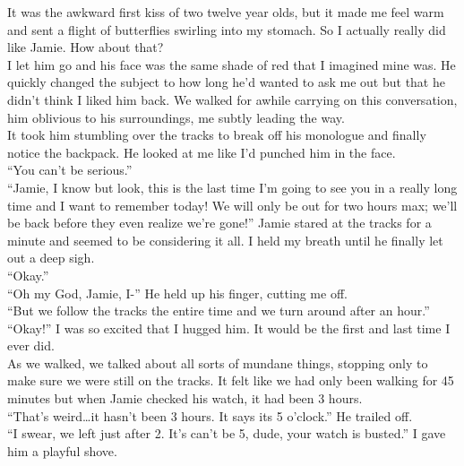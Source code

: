 \documentclass[a5paper]{scrartcl}
\begin{document}
It was the awkward first kiss of two twelve year olds, but it made me feel warm and sent a flight of butterflies swirling into my stomach. So I actually really did like Jamie. How about that?\\


I let him go and his face was the same shade of red that I imagined mine was. He quickly changed the subject to how long he'd wanted to ask me out but that he didn't think I liked him back. We walked for awhile carrying on this conversation, him oblivious to his surroundings, me subtly leading the way. \\


It took him stumbling over the tracks to break off his monologue and finally notice the backpack. He looked at me like I'd punched him in the face.\\


\enquote{You can't be serious.}\\

\enquote{Jamie, I know but look, this is the last time I'm going to see you in a really long time and I want to remember today! We will only be out for two hours max; we'll be back before they even realize we're gone!}
Jamie stared at the tracks for a minute and seemed to be considering it all. I held my breath until he finally let out a deep sigh.\\

\enquote{Okay.}\\


\enquote{Oh my God, Jamie, I-} He held up his finger, cutting me off.\\


\enquote{But we follow the tracks the entire time and we turn around after an hour.}\\


\enquote{Okay!} I was so excited that I hugged him. It would be the first and last time I ever did.\\


As we walked, we talked about all sorts of mundane things, stopping only to make sure we were still on the tracks. It felt like we had only been walking for 45 minutes but when Jamie checked his watch, it had been 3 hours.\\


\enquote{That's weird\dots it hasn't been 3 hours. It says its 5 o'clock.} He trailed off.\\


\enquote{I swear, we left just after 2. It's can't be 5, dude, your watch is busted.} I gave him a playful shove.\\
\end{document}
